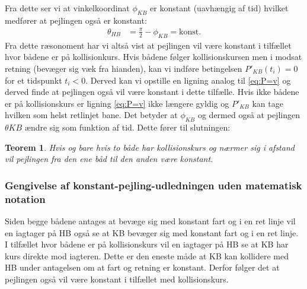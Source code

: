 \documentclass[%
 reprint,
nofootinbib,
aps,
]{revtex4-1}
\newtheorem{theorem}{Teorem}
\begin{document}
Fra dette ser vi at vinkelkoordinat $\phi_{KB}$ er konstant (uavhængig af tid) hvilket medfører at pejlingen også er konstant:
\begin{align*}
  \theta_{HB} &= \frac{\pi}{2} - \phi_{KB} = \text{konst.}
\end{align*}
Fra dette ræsonoment har vi altså vist at pejlingen vil være konstant i tilfællet hvor bådene er på kollisionkurs. Hvis bådene følger kollisionskursen men i modsat retning (bevæger sig væk fra hianden), kan vi indføre betingelsen $P'_{KB}(t_i) = 0$ for et tidspunkt $t_i < 0$. Derved kan vi opstille en ligning analog til \ref{eq:P=v} og derved finde at pejlingen også vil være konstant i dette tilfælle. Hvis ikke bådene er på kollisionskurs er ligning \ref{eq:P=v} ikke længere gyldig og $P'_{KB}$ kan tage hvilken som helst retlinjet bane. Det betyder at $\phi_{KB}$ og dermed også at pejlingen $\theta{KB}$ ændre sig som funktion af tid. Dette fører til slutningen:
\begin{theorem}
  Hvis og bare hvis to både har kollisionskurs og nærmer sig i afstand vil pejlingen fra den ene båd til den anden være konstant.
  \label{Teo:pejling}
\end{theorem}
\subsubsection{Gengivelse af konstant-pejling-udledningen uden matematisk notation}
Siden begge bådene antages at bevæge sig med konstant fart og i en ret linje vil en iagtager på HB også se at KB bevæger sig med konstant fart og i en ret linje. I tilfællet hvor bådene er på kollisionskurs vil en iagtager på HB se at KB har kurs direkte mod iagteren. Dette er den eneste måde at KB kan kollidere med HB under antagelsen om at fart og retning er konstant. Derfor følger det at pejlingen også vil være konstant i tilfællet med kollisionskurs.


\end{document}

